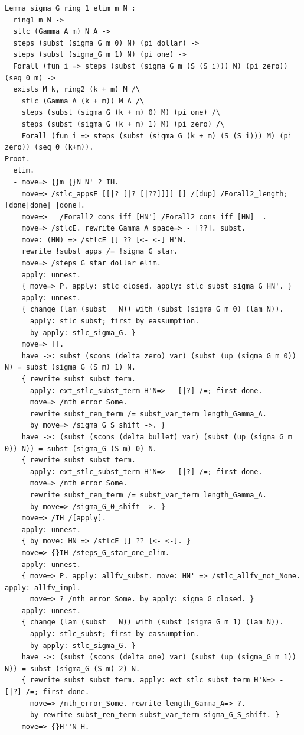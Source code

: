 \documentclass[10pt,a4paper]{amsart}
\begin{document}
\begin{lstlisting}
Lemma sigma_G_ring_1_elim m N :
  ring1 m N ->
  stlc (Gamma_A m) N A ->
  steps (subst (sigma_G m 0) N) (pi dollar) ->
  steps (subst (sigma_G m 1) N) (pi one) ->
  Forall (fun i => steps (subst (sigma_G m (S (S i))) N) (pi zero)) (seq 0 m) ->
  exists M k, ring2 (k + m) M /\
    stlc (Gamma_A (k + m)) M A /\
    steps (subst (sigma_G (k + m) 0) M) (pi one) /\
    steps (subst (sigma_G (k + m) 1) M) (pi zero) /\
    Forall (fun i => steps (subst (sigma_G (k + m) (S (S i))) M) (pi zero)) (seq 0 (k+m)).
Proof. 
  elim.
  - move=> {}m {}N N' ? IH.
    move=> /stlc_appsE [[|? [|? [|??]]]] [] /[dup] /Forall2_length; [done|done| |done].
    move=> _ /Forall2_cons_iff [HN'] /Forall2_cons_iff [HN] _.
    move=> /stlcE. rewrite Gamma_A_space=> - [??]. subst.
    move: (HN) => /stlcE [] ?? [<- <-] H'N.
    rewrite !subst_apps /= !sigma_G_star.
    move=> /steps_G_star_dollar_elim.
    apply: unnest.
    { move=> P. apply: stlc_closed. apply: stlc_subst_sigma_G HN'. }
    apply: unnest. 
    { change (lam (subst _ N)) with (subst (sigma_G m 0) (lam N)).
      apply: stlc_subst; first by eassumption.
      by apply: stlc_sigma_G. }
    move=> [].
    have ->: subst (scons (delta zero) var) (subst (up (sigma_G m 0)) N) = subst (sigma_G (S m) 1) N.
    { rewrite subst_subst_term.
      apply: ext_stlc_subst_term H'N=> - [|?] /=; first done.
      move=> /nth_error_Some.
      rewrite subst_ren_term /= subst_var_term length_Gamma_A.
      by move=> /sigma_G_S_shift ->. }
    have ->: (subst (scons (delta bullet) var) (subst (up (sigma_G m 0)) N)) = subst (sigma_G (S m) 0) N.
    { rewrite subst_subst_term.
      apply: ext_stlc_subst_term H'N=> - [|?] /=; first done.
      move=> /nth_error_Some.
      rewrite subst_ren_term /= subst_var_term length_Gamma_A.
      by move=> /sigma_G_0_shift ->. }
    move=> /IH /[apply].
    apply: unnest.
    { by move: HN => /stlcE [] ?? [<- <-]. }
    move=> {}IH /steps_G_star_one_elim.
    apply: unnest. 
    { move=> P. apply: allfv_subst. move: HN' => /stlc_allfv_not_None. apply: allfv_impl.
      move=> ? /nth_error_Some. by apply: sigma_G_closed. }
    apply: unnest. 
    { change (lam (subst _ N)) with (subst (sigma_G m 1) (lam N)).
      apply: stlc_subst; first by eassumption.
      by apply: stlc_sigma_G. }
    have ->: (subst (scons (delta one) var) (subst (up (sigma_G m 1)) N)) = subst (sigma_G (S m) 2) N.
    { rewrite subst_subst_term. apply: ext_stlc_subst_term H'N=> - [|?] /=; first done.
      move=> /nth_error_Some. rewrite length_Gamma_A=> ?.
      by rewrite subst_ren_term subst_var_term sigma_G_S_shift. }
    move=> {}H''N H.

\end{lstlisting}
\end{document}
